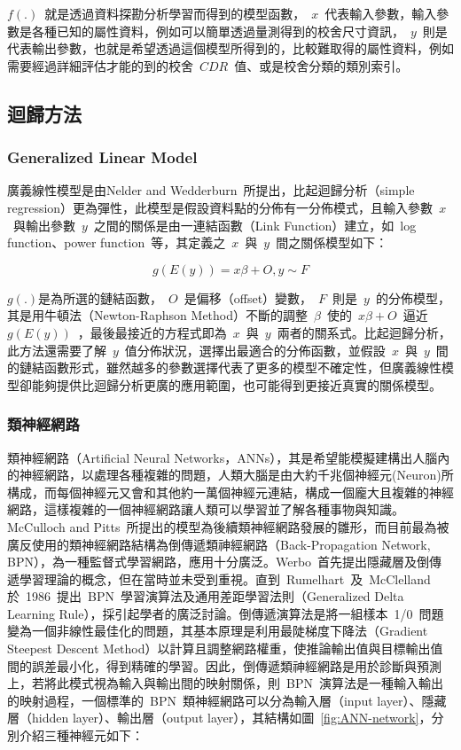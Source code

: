 $f(.)$~就是透過資料探勘分析學習而得到的模型函數，~$x$~代表輸入參數，輸入參數是各種已知的屬性資料，例如可以簡單透過量測得到的校舍尺寸資訊，~$y$~則是代表輸出參數，也就是希望透過這個模型所得到的，比較難取得的屬性資料，例如需要經過詳細評估才能的到的校舍~$CDR$~值、或是校舍分類的類別索引。

\subsection{迴歸方法}

\subsubsection{Generalized Linear Model}

廣義線性模型是由Nelder and Wedderburn~\cite{citeulike:5485398}所提出，比起迴歸分析（simple regression）更為彈性，此模型是假設資料點的分佈有一分佈模式，且輸入參數~$x$~與輸出參數~$y$~之間的關係是由一連結函數（Link Function）建立，如~log function、power function~等，其定義之~$x$~與~$y$~間之關係模型如下：


\begin{equation} g(E(y)) = x\beta + O, y \sim F \label{eq:GLM}\end{equation} 

$g(.)$是為所選的鏈結函數，~$O$~是偏移（offset）變數，~$F$~則是~$y$~的分佈模型，其是用牛頓法（Newton-Raphson Method）不斷的調整~$\beta$~使的~$x\beta + O$~逼近~$g(E(y))$~，最後最接近的方程式即為~$x$~與~$y$~兩者的關系式。比起迴歸分析，此方法還需要了解~$y$~值分佈狀況，選擇出最適合的分佈函數，並假設~$x$~與~$y$~間的鏈結函數形式，雖然越多的參數選擇代表了更多的模型不確定性，但廣義線性模型卻能夠提供比迴歸分析更廣的應用範圍，也可能得到更接近真實的關係模型。


\subsubsection{類神經網路}

類神經網路（Artificial Neural Networks，ANNs），其是希望能模擬建構出人腦內的神經網路，以處理各種複雜的問題，人類大腦是由大約千兆個神經元(Neuron)所構成，而每個神經元又會和其他約一萬個神經元連結，構成一個龐大且複雜的神經網路，這樣複雜的一個神經網路讓人類可以學習並了解各種事物與知識。McCulloch and Pitts~\cite{mcculloch1943logical}所提出的模型為後續類神經網路發展的雛形，而目前最為被廣反使用的類神經網路結構為倒傳遞類神經網路（Back-Propagation Network, BPN），為一種監督式學習網路，應用十分廣泛。Werbo~\cite{werbos1974beyond}首先提出隱藏層及倒傳遞學習理論的概念，但在當時並未受到重視。直到~Rumelhart~及~McClelland\cite{rummelhart1986learning}於~1986~提出~BPN~學習演算法及通用差距學習法則（Generalized Delta Learning Rule），採引起學者的廣泛討論。倒傳遞演算法是將一組樣本~1/0~問題變為一個非線性最佳化的問題，其基本原理是利用最陡梯度下降法（Gradient Steepest Descent Method）以計算且調整網路權重，使推論輸出值與目標輸出值間的誤差最小化，得到精確的學習。因此，倒傳遞類神經網路是用於診斷與預測上，若將此模式視為輸入與輸出間的映射關係，則~BPN~演算法是一種輸入輸出的映射過程，一個標準的~BPN~類神經網路可以分為輸入層（input layer）、隱藏層（hidden layer）、輸出層（output layer），其結構如圖~\ref{fig:ANN-network}，分別介紹三種神經元如下：

